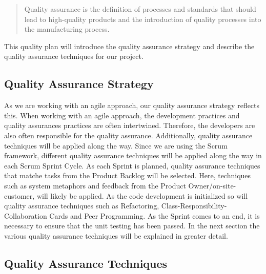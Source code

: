 \begin{quotation}
Quality assurance is the definition of processes and standards that should lead to high-quality products and the introduction of quality processes into the manufacturing process. \cite[p.]{Sommerville} \end{quotation}
This quality plan will introduce the quality assurance strategy and describe the quality assurance techniques for our project.

\subsection {Quality Assurance Strategy}
As we are working with an agile approach, our quality assurance strategy reflects this. When working with an agile approach, the development practices and quality assurances practices are often intertwined. Therefore, the developers are also often responsible for the quality assurance. Additionally, quality assurance techniques will be applied along the way. \cite{Hou}
Since we are using the Scrum framework, different quality assurance techniques will be applied along the way in each Scrum Sprint Cycle. As each Sprint is planned, quality assurance techniques that matche tasks from the Product Backlog will be selected. Here, techniques such as system metaphors and feedback from the Product Owner/on-site-customer, will likely be applied. As the code development is initialized so will quality assurance techniques such as Refactoring, Class-Responsibility-Collaboration Cards and Peer Programming. As the Sprint comes to an end, it is necessary to ensure that the unit testing has been passed.
In the next section the various quality assurance techniques will be explained in greater detail.

\subsection {Quality Assurance Techniques}

